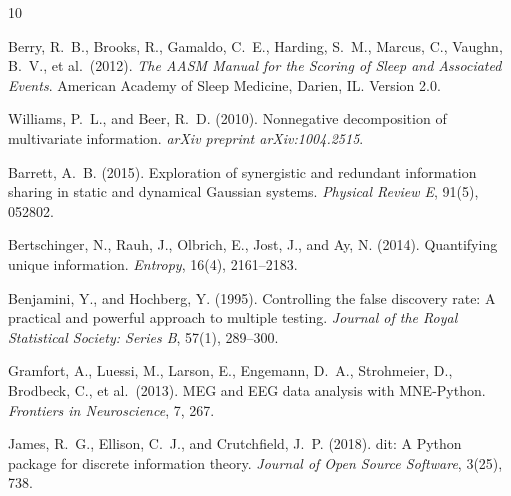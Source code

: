 \documentclass[11pt,a4paper]{article}
\begin{document}
\begin{thebibliography}{10}

Berry, R.~B., Brooks, R., Gamaldo, C.~E., Harding, S.~M., Marcus, C.,
Vaughn, B.~V., et al.\ (2012).
\newblock \textit{The AASM Manual for the Scoring of Sleep and Associated
  Events}.
\newblock American Academy of Sleep Medicine, Darien, IL. Version 2.0.

Williams, P.~L., and Beer, R.~D. (2010).
\newblock Nonnegative decomposition of multivariate information.
\newblock \textit{arXiv preprint arXiv:1004.2515}.

Barrett, A.~B. (2015).
\newblock Exploration of synergistic and redundant information sharing in
  static and dynamical Gaussian systems.
\newblock \textit{Physical Review E}, 91(5), 052802.

Bertschinger, N., Rauh, J., Olbrich, E., Jost, J., and Ay, N. (2014).
\newblock Quantifying unique information.
\newblock \textit{Entropy}, 16(4), 2161--2183.

Benjamini, Y., and Hochberg, Y. (1995).
\newblock Controlling the false discovery rate: A practical and powerful
  approach to multiple testing.
\newblock \textit{Journal of the Royal Statistical Society: Series B},
  57(1), 289--300.

Gramfort, A., Luessi, M., Larson, E., Engemann, D.~A., Strohmeier, D.,
Brodbeck, C., et al.\ (2013).
\newblock MEG and EEG data analysis with MNE-Python.
\newblock \textit{Frontiers in Neuroscience}, 7, 267.

James, R.~G., Ellison, C.~J., and Crutchfield, J.~P. (2018).
\newblock dit: A Python package for discrete information theory.
\newblock \textit{Journal of Open Source Software}, 3(25), 738.

\end{thebibliography}
\end{document}
